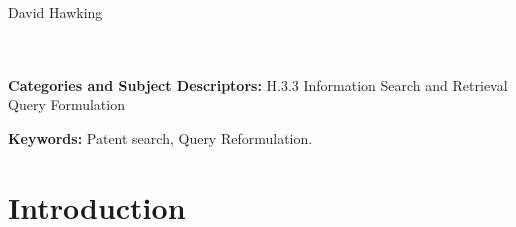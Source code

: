 \documentclass{sig-alternate}
\begin{document}
{%
\alignauthor 
      David Hawking\\%
       \\
       \\
}

\date{16 February 2015}

\maketitle
\begin{abstract}


\end{abstract}



\vspace{1mm}
\noindent
{\bf Categories and Subject Descriptors:} H.3.3 {Information Search and Retrieval} {Query Formulation}

\vspace{1mm}
\noindent
{\bf Keywords:} Patent search, Query Reformulation.%


\section{Introduction}

\end{document}

